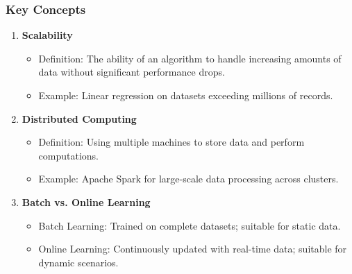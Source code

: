 \documentclass[aspectratio=169]{beamer}
\begin{document}
\begin{frame}[fragile]
    \frametitle{Key Concepts}
    \begin{enumerate}
        \item \textbf{Scalability}
            \begin{itemize}
                \item Definition: The ability of an algorithm to handle increasing amounts of data without significant performance drops.
                \item Example: Linear regression on datasets exceeding millions of records.
            \end{itemize}
        
        \item \textbf{Distributed Computing}
            \begin{itemize}
                \item Definition: Using multiple machines to store data and perform computations.
                \item Example: Apache Spark for large-scale data processing across clusters.
            \end{itemize}
        
        \item \textbf{Batch vs. Online Learning}
            \begin{itemize}
                \item Batch Learning: Trained on complete datasets; suitable for static data.
                \item Online Learning: Continuously updated with real-time data; suitable for dynamic scenarios.
            \end{itemize}
    \end{enumerate}
\end{frame}
\end{document}
